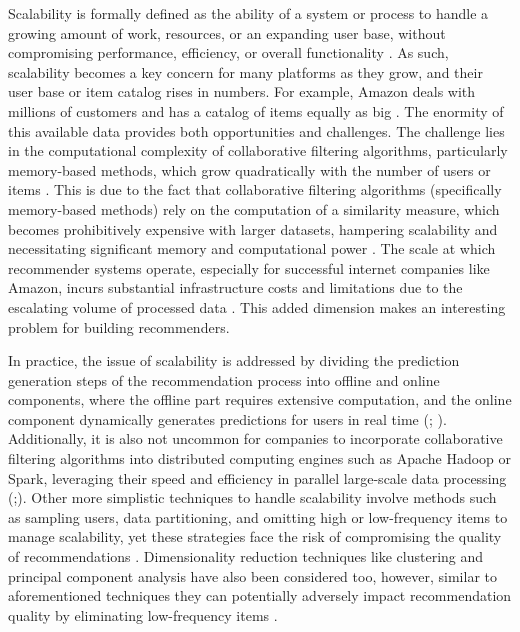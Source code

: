 Scalability is formally defined as the ability of a system or process to handle a growing amount of work, resources, or an expanding user base, without compromising performance, efficiency, or overall functionality \cite{burke2015robust}. As such, scalability becomes a key concern for many platforms as they grow, and their user base or item catalog rises in numbers. For example, Amazon deals with millions of customers and has a catalog of items equally as big \cite{smith2017two}. The enormity of this available data provides both opportunities and challenges. The challenge lies in
the computational complexity of collaborative filtering algorithms, particularly memory-based methods, which grow quadratically with the number of users or items \cite{singh2020scalability}. This is due to the fact that collaborative filtering algorithms (specifically memory-based methods) rely on the computation of a similarity measure, which becomes prohibitively expensive with larger datasets, hampering scalability and necessitating significant memory and computational power \cite{smith2017two}. The scale at which recommender systems operate, especially for successful internet companies like Amazon, incurs substantial infrastructure costs and limitations due to the escalating volume of processed data \cite{singh2020scalability}. This added dimension makes an interesting problem for building recommenders.

In practice, the issue of scalability is addressed by dividing the prediction generation steps of the recommendation process into offline and online components, where the offline part requires extensive computation, and the online component dynamically generates predictions for users in real time (\cite{singh2020scalability}; \cite{sarwar2000analysis}). Additionally, it is also not uncommon for companies to incorporate collaborative filtering algorithms into distributed computing engines such as Apache Hadoop or Spark, leveraging their speed and efficiency in parallel large-scale data processing (\cite{burke2015robust};\cite{smith2017two}). Other more simplistic techniques to handle scalability involve methods such as sampling users, data partitioning, and omitting high or low-frequency items to manage scalability, yet these strategies face the risk of compromising the quality of recommendations \cite{singh2020scalability}. Dimensionality reduction techniques like clustering and principal component analysis have also been considered too, however, similar to aforementioned techniques they can potentially adversely impact recommendation quality by eliminating low-frequency items \cite{sarwar2000application}. 

